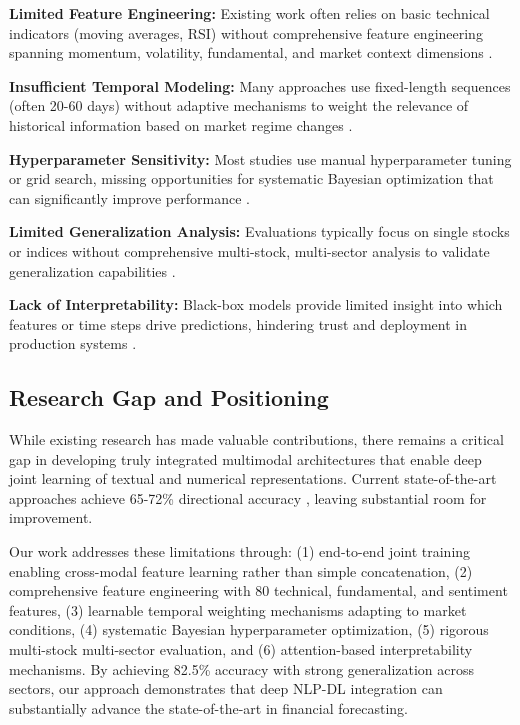 \documentclass[conference]{IEEEtran}
\begin{document}
\textbf{Limited Feature Engineering:} Existing work often relies on basic technical indicators (moving averages, RSI) without comprehensive feature engineering spanning momentum, volatility, fundamental, and market context dimensions \cite{fischer2018deep, nelson2017stock}.

\textbf{Insufficient Temporal Modeling:} Many approaches use fixed-length sequences (often 20-60 days) without adaptive mechanisms to weight the relevance of historical information based on market regime changes \cite{roondiwala2017predicting, baek2018modaugnet}.

\textbf{Hyperparameter Sensitivity:} Most studies use manual hyperparameter tuning or grid search, missing opportunities for systematic Bayesian optimization that can significantly improve performance \cite{li2019enhancing, zhou2021informer}.

\textbf{Limited Generalization Analysis:} Evaluations typically focus on single stocks or indices without comprehensive multi-stock, multi-sector analysis to validate generalization capabilities \cite{hu2018listening, wu2020deep}.

\textbf{Lack of Interpretability:} Black-box models provide limited insight into which features or time steps drive predictions, hindering trust and deployment in production systems \cite{sawhney2020spatiotemporal, shah2022stock}.

\subsection{Research Gap and Positioning}

While existing research has made valuable contributions, there remains a critical gap in developing truly integrated multimodal architectures that enable deep joint learning of textual and numerical representations. Current state-of-the-art approaches achieve 65-72\% directional accuracy \cite{dang2020sentiment, shah2022stock}, leaving substantial room for improvement.

Our work addresses these limitations through: (1) end-to-end joint training enabling cross-modal feature learning rather than simple concatenation, (2) comprehensive feature engineering with 80 technical, fundamental, and sentiment features, (3) learnable temporal weighting mechanisms adapting to market conditions, (4) systematic Bayesian hyperparameter optimization, (5) rigorous multi-stock multi-sector evaluation, and (6) attention-based interpretability mechanisms. By achieving 82.5\% accuracy with strong generalization across sectors, our approach demonstrates that deep NLP-DL integration can substantially advance the state-of-the-art in financial forecasting.
\end{document}
